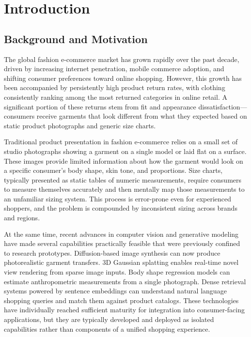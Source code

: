 \chapter{Introduction}

\section{Background and Motivation}
The global fashion e-commerce market has grown rapidly over the past decade, driven by increasing internet penetration, mobile commerce adoption, and shifting consumer preferences toward online shopping. However, this growth has been accompanied by persistently high product return rates, with clothing consistently ranking among the most returned categories in online retail. A significant portion of these returns stem from fit and appearance dissatisfaction—consumers receive garments that look different from what they expected based on static product photographs and generic size charts.

Traditional product presentation in fashion e-commerce relies on a small set of studio photographs showing a garment on a single model or laid flat on a surface. These images provide limited information about how the garment would look on a specific consumer's body shape, skin tone, and proportions. Size charts, typically presented as static tables of numeric measurements, require consumers to measure themselves accurately and then mentally map those measurements to an unfamiliar sizing system. This process is error-prone even for experienced shoppers, and the problem is compounded by inconsistent sizing across brands and regions.

At the same time, recent advances in computer vision and generative modeling have made several capabilities practically feasible that were previously confined to research prototypes. Diffusion-based image synthesis can now produce photorealistic garment transfers. 3D Gaussian splatting enables real-time novel view rendering from sparse image inputs. Body shape regression models can estimate anthropometric measurements from a single photograph. Dense retrieval systems powered by sentence embeddings can understand natural language shopping queries and match them against product catalogs. These technologies have individually reached sufficient maturity for integration into consumer-facing applications, but they are typically developed and deployed as isolated capabilities rather than components of a unified shopping experience.


